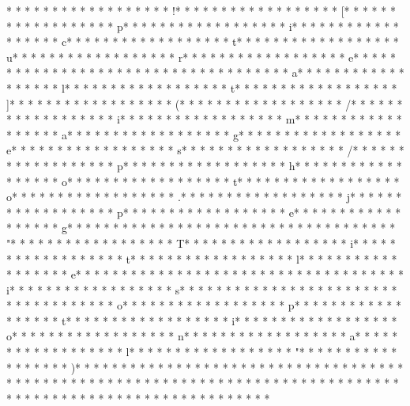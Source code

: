 * * *  * * *  * * *  *  * * *  *  * * *  * !* * *  * * *  * * *  *  * * *  *  * * *  * [* * *  * * *  * * *  *  * * *  *  * * *  * p* * *  * * *  * * *  *  * * *  *  * * *  * i* * *  * * *  * * *  *  * * *  *  * * *  * c* * *  * * *  * * *  *  * * *  *  * * *  * t* * *  * * *  * * *  *  * * *  *  * * *  * u* * *  * * *  * * *  *  * * *  *  * * *  * r* * *  * * *  * * *  *  * * *  *  * * *  * e* * *  * * *  * * *  *  * * *  *  * * *  *  * * *  * * *  * * *  *  * * *  *  * * *  * a* * *  * * *  * * *  *  * * *  *  * * *  * l* * *  * * *  * * *  *  * * *  *  * * *  * t* * *  * * *  * * *  *  * * *  *  * * *  * ]* * *  * * *  * * *  *  * * *  *  * * *  * (* * *  * * *  * * *  *  * * *  *  * * *  * /* * *  * * *  * * *  *  * * *  *  * * *  * i* * *  * * *  * * *  *  * * *  *  * * *  * m* * *  * * *  * * *  *  * * *  *  * * *  * a* * *  * * *  * * *  *  * * *  *  * * *  * g* * *  * * *  * * *  *  * * *  *  * * *  * e* * *  * * *  * * *  *  * * *  *  * * *  * s* * *  * * *  * * *  *  * * *  *  * * *  * /* * *  * * *  * * *  *  * * *  *  * * *  * p* * *  * * *  * * *  *  * * *  *  * * *  * h* * *  * * *  * * *  *  * * *  *  * * *  * o* * *  * * *  * * *  *  * * *  *  * * *  * t* * *  * * *  * * *  *  * * *  *  * * *  * o* * *  * * *  * * *  *  * * *  *  * * *  * .* * *  * * *  * * *  *  * * *  *  * * *  * j* * *  * * *  * * *  *  * * *  *  * * *  * p* * *  * * *  * * *  *  * * *  *  * * *  * e* * *  * * *  * * *  *  * * *  *  * * *  * g* * *  * * *  * * *  *  * * *  *  * * *  *  * * *  * * *  * * *  *  * * *  *  * * *  * "* * *  * * *  * * *  *  * * *  *  * * *  * T* * *  * * *  * * *  *  * * *  *  * * *  * i* * *  * * *  * * *  *  * * *  *  * * *  * t* * *  * * *  * * *  *  * * *  *  * * *  * l* * *  * * *  * * *  *  * * *  *  * * *  * e* * *  * * *  * * *  *  * * *  *  * * *  *  * * *  * * *  * * *  *  * * *  *  * * *  * i* * *  * * *  * * *  *  * * *  *  * * *  * s* * *  * * *  * * *  *  * * *  *  * * *  *  * * *  * * *  * * *  *  * * *  *  * * *  * o* * *  * * *  * * *  *  * * *  *  * * *  * p* * *  * * *  * * *  *  * * *  *  * * *  * t* * *  * * *  * * *  *  * * *  *  * * *  * i* * *  * * *  * * *  *  * * *  *  * * *  * o* * *  * * *  * * *  *  * * *  *  * * *  * n* * *  * * *  * * *  *  * * *  *  * * *  * a* * *  * * *  * * *  *  * * *  *  * * *  * l* * *  * * *  * * *  *  * * *  *  * * *  * "* * *  * * *  * * *  *  * * *  *  * * *  * )* * *  * * *  * * *  *  * * *  *  * * *  *  * * *  * * *  * * *  *  * * *  *  * * *  *  * * *  * * *  * * *  *  * * *  *  * * *  *  * * *  * * *  * * *  *  * * *  *  * * *  *  * * *  * * *  * * *  *  * * *  *  * * *  *  * * *  * * *  * * *  *  * * *  *  * * *  * 

